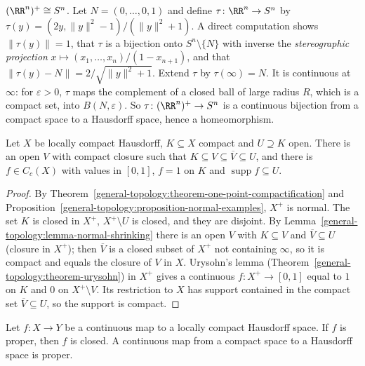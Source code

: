 \begin{example}\label{general-topology:example-stereographic}
$(\RR^n)^+ \cong S^n$. Let $N = (0, \ldots, 0, 1)$ and define $\tau \colon \RR^n \to S^n$ by
$\tau(y) = (2y, \|y\|^2 - 1)/(\|y\|^2 + 1)$. A direct computation shows $\|\tau(y)\| = 1$, that $\tau$ is a bijection onto $S^n \setminus \{N\}$ with inverse
the \emph{stereographic projection} $x \mapsto (x_1, \ldots, x_n)/(1 - x_{n+1})$, and that $\|\tau(y) - N\| = 2/\sqrt{\|y\|^2 + 1}$. Extend $\tau$ by
$\tau(\infty) = N$. It is continuous at $\infty$: for $\varepsilon > 0$, $\tau$ maps the complement of a closed ball of large radius $R$, which is a compact
set, into $B(N, \varepsilon)$. So $\tau \colon (\RR^n)^+ \to S^n$ is a continuous bijection from a compact space to a Hausdorff space, hence a homeomorphism.
\end{example}

\begin{lemma}\label{general-topology:lemma-lch-shrinking}
Let $X$ be locally compact Hausdorff, $K \subseteq X$ compact and $U \supseteq K$ open. There is an open $V$ with compact closure such that
$K \subseteq V \subseteq \overline{V} \subseteq U$, and there is $f \in C_c(X)$ with values in $[0, 1]$, $f = 1$ on $K$ and $\operatorname{supp} f \subseteq U$.
\end{lemma}

\begin{proof}
By Theorem~\ref{general-topology:theorem-one-point-compactification} and Proposition~\ref{general-topology:proposition-normal-examples}, $X^+$ is
normal. The set $K$ is closed in $X^+$, $X^+ \setminus U$ is closed, and they are disjoint. By Lemma~\ref{general-topology:lemma-normal-shrinking} there is an
open $V$ with $K \subseteq V$ and $\overline{V} \subseteq U$ (closure in $X^+$); then $\overline{V}$ is a closed subset of $X^+$ not containing $\infty$, so it
is compact and equals the closure of $V$ in $X$. Urysohn's lemma (Theorem~\ref{general-topology:theorem-urysohn}) in $X^+$ gives a continuous
$f \colon X^+ \to [0, 1]$ equal to $1$ on $K$ and $0$ on $X^+ \setminus V$. Its restriction to $X$ has support contained in the compact set $\overline{V} \subseteq U$,
so the support is compact.
\end{proof}

\begin{proposition}\label{general-topology:proposition-proper-closed}
Let $f \colon X \to Y$ be a continuous map to a locally compact Hausdorff space. If $f$ is proper, then $f$ is closed. A continuous map from a compact
space to a Hausdorff space is proper.
\end{proposition}

